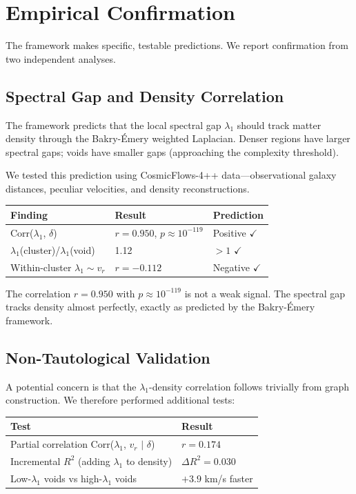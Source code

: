 \documentclass[11pt,a4paper]{article}
\theoremstyle{definition}
\theoremstyle{remark}
\begin{document}
\section{Empirical Confirmation}

The framework makes specific, testable predictions. We report confirmation from two independent analyses.

\subsection{Spectral Gap and Density Correlation}

The framework predicts that the local spectral gap $\lambda_1$ should track matter density through the Bakry-\'Emery weighted Laplacian. Denser regions have larger spectral gaps; voids have smaller gaps (approaching the complexity threshold).

We tested this prediction using CosmicFlows-4++ data---observational galaxy distances, peculiar velocities, and density reconstructions.

\begin{center}
\begin{tabular}{lll}
\toprule
\textbf{Finding} & \textbf{Result} & \textbf{Prediction} \\
\midrule
Corr($\lambda_1$, $\delta$) & $r = 0.950$, $p \approx 10^{-119}$ & Positive $\checkmark$ \\
$\lambda_1$(cluster)/$\lambda_1$(void) & 1.12 & $> 1$ $\checkmark$ \\
Within-cluster $\lambda_1 \sim v_r$ & $r = -0.112$ & Negative $\checkmark$ \\
\bottomrule
\end{tabular}
\end{center}

The correlation $r = 0.950$ with $p \approx 10^{-119}$ is not a weak signal. The spectral gap tracks density almost perfectly, exactly as predicted by the Bakry-\'Emery framework.

\subsection{Non-Tautological Validation}

A potential concern is that the $\lambda_1$-density correlation follows trivially from graph construction. We therefore performed additional tests:

\begin{center}
\begin{tabular}{ll}
\toprule
\textbf{Test} & \textbf{Result} \\
\midrule
Partial correlation Corr($\lambda_1$, $v_r$ $|$ $\delta$) & $r = 0.174$ \\
Incremental $R^2$ (adding $\lambda_1$ to density) & $\Delta R^2 = 0.030$ \\
Low-$\lambda_1$ voids vs high-$\lambda_1$ voids & $+3.9$ km/s faster \\
\bottomrule
\end{tabular}
\end{center}
\end{document}
